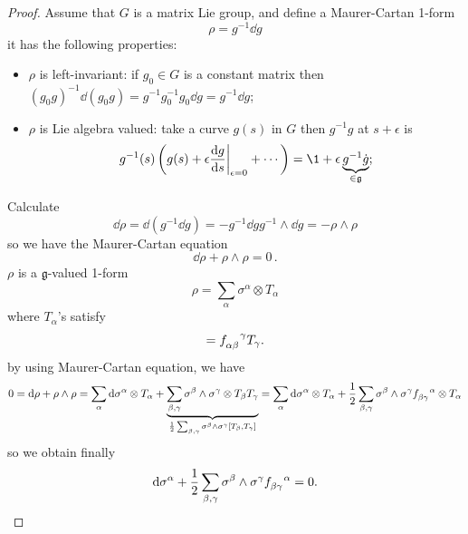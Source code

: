 \documentclass[a4paper,11pt]{article}
\begin{document}
    \begin{proof}
    Assume that $G$ is a matrix Lie group, and define a Maurer-Cartan 1-form 
    \begin{equation}
        \rho = g^{-1} \dd{g}
    \end{equation}
    it has the following properties: 
    \begin{itemize}
        \item $\rho$ is left-invariant: if $g_0 \in G$ is a constant matrix then $(g_0 g)^{-1} \dd{(g_0 g)} = g^{-1} g_0^{-1} g_0 \dd{g} = g^{-1} \dd{g}$;
        \item $\rho$ is Lie algebra valued: take a curve $g(s)$ in $G$ then $g^{-1} g$ at $s+\epsilon$ is \begin{equation}
            g^{-1}(s) \left( g(s) + \epsilon \dv{g}{s}\bigg|_{\epsilon = 0} + \cdots \right) = \1 + \epsilon \underbrace{g^{-1} \dot g}_{\in \mathfrak{g}};
        \end{equation}
        \end{itemize}

        Calculate 
        \begin{equation}
            \dd{\rho} = \dd{(g^{-1} \dd{g})} = - g^{-1} \dd{g} g^{-1} \wedge \dd{g} = - \rho \wedge \rho
        \end{equation}
        so we have the Maurer-Cartan equation 
        \begin{equation}
            \boxed{\dd{\rho} + \rho \wedge \rho = 0}\,.
        \end{equation}
        $\rho$ is a $\mathfrak{g}$-valued 1-form
        \begin{equation}
            \rho = \sum_\alpha \sigma^\alpha \otimes T_\alpha
        \end{equation}
        where $T_\alpha$'s satisfy
        \begin{equation}
            [T_\alpha, T_\beta] = f\indices{_{\alpha \beta}^\gamma} T_\gamma.
        \end{equation}
        by using Maurer-Cartan equation, we have 
        \begin{equation}
            0 = \dd{\rho} + \rho \wedge \rho = \sum_\alpha \dd{\sigma^\alpha} \otimes T_\alpha + \underbrace{\sum_{\beta,\gamma} \sigma^\beta \wedge \sigma^\gamma \otimes T_{\beta} T_{\gamma}}_{\frac{1}{2} \sum_{\beta,\gamma} \sigma^\beta \wedge \sigma^\gamma [T_\beta, T_\gamma]} = \sum_\alpha \dd{\sigma^\alpha} \otimes T_\alpha + \frac{1}{2} \sum_{\beta,\gamma} \sigma^\beta \wedge \sigma^\gamma f\indices{_{\beta \gamma}^\alpha} \otimes T_\alpha 
        \end{equation}
        so we obtain finally
        \begin{equation}
            \dd{\sigma^\alpha} + \frac{1}{2} \sum_{\beta,\gamma} \sigma^\beta \wedge \sigma^\gamma f\indices{_{\beta \gamma}^\alpha} = 0.
        \end{equation}
    \end{proof}
\end{document}
